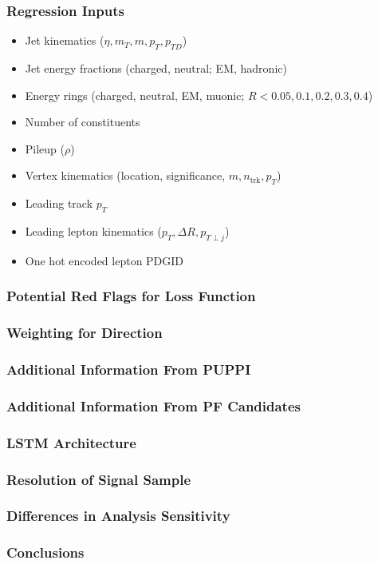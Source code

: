 \documentclass{beamer}
\newcommand{\beginbackup}{
  \newcounter{framenumbervorappendix}
  \setcounter{framenumbervorappendix}{\value{framenumber}}
}
\newcommand{\backupend}{
  \addtocounter{framenumbervorappendix}{-\value{framenumber}}
  \addtocounter{framenumber}{\value{framenumbervorappendix}}
}
\begin{document}
\begin{frame}
  \frametitle{Regression Inputs}

  \begin{itemize}
  \item Jet kinematics ($\eta, m_T, m, p_T, p_{TD}$)
  \item Jet energy fractions (charged, neutral; EM, hadronic)
  \item Energy rings (charged, neutral, EM, muonic; $R < 0.05, 0.1, 0.2, 0.3, 0.4$)
  \item Number of constituents
  \item Pileup ($\rho$)
  \item Vertex kinematics (location, significance, $m, n_\mathrm{trk}, p_T$)
  \item Leading track $p_T$
  \item Leading lepton kinematics ($p_T, \Delta R, p_{T\perp j}$)
  \item One hot encoded lepton PDGID
  \end{itemize}

\end{frame}

\begin{frame}
  \frametitle{Potential Red Flags for Loss Function}
\end{frame}

\begin{frame}
  \frametitle{Weighting for Direction}
\end{frame}

\begin{frame}
  \frametitle{Additional Information From PUPPI}
\end{frame}

\begin{frame}
  \frametitle{Additional Information From PF Candidates}
\end{frame}

\begin{frame}
  \frametitle{LSTM Architecture}
\end{frame}

\begin{frame}
  \frametitle{Resolution of Signal Sample}
\end{frame}

\begin{frame}
  \frametitle{Differences in Analysis Sensitivity}
\end{frame}

\begin{frame}
  \frametitle{Conclusions}
\end{frame}

\begin{comment}
\beginbackup

\begin{frame}
  \frametitle{Backup Slides}
\end{frame}



\backupend
\end{comment}
\end{document}
